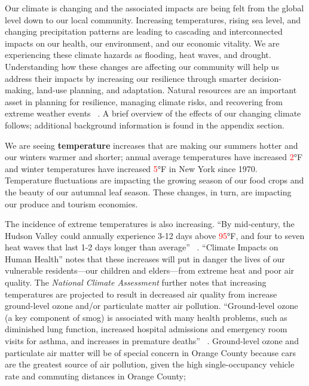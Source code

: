 Our climate is changing and the associated impacts are being felt from the 
global level down to our local community. Increasing temperatures, rising sea 
level, and changing precipitation patterns are leading to cascading and 
interconnected impacts on our health, our environment, and our economic 
vitality. We are experiencing these climate hazards as flooding, heat waves, 
and drought. Understanding how these changes are affecting our community will 
help us address their impacts by increasing our resilience through smarter 
decision-making, land-use planning, and adaptation. Natural resources are an 
important asset in planning for resilience, managing climate risks, and 
recovering from extreme weather events ~\citep{haeckel2014}. A brief overview of 
the effects of our changing climate follows; additional background information 
is found in the appendix section.
\par
We are seeing \textbf{temperature} increases that are making our summers hotter 
and our winters warmer and shorter; annual average temperatures have increased 
\textcolor{red}{2}$\si{\degree}$F and winter temperatures have increased 
\textcolor{red}{5}$\si{\degree}$F in New York since 1970. Temperature fluctuations 
are impacting the growing season of our food crops and the beauty of our 
autumnal leaf season. These changes, in turn, are impacting our produce and 
tourism economies.
\par
The incidence of extreme temperatures is also increasing. ``By mid-century, 
the Hudson Valley could annually experience 3-12 days above 
\textcolor{red}{95}$\si{\degree}$F, and four to seven heat waves that last 1-2 days 
longer than average'' ~\citep{Zemaitis2018}. ``Climate Impacts on Human Health'' 
notes that these increases will put in danger the lives of our vulnerable 
residents—our children and elders—from extreme heat and poor air quality. The 
\textit{National Climate Assessment} further notes that increasing temperatures 
are projected to result in decreased air quality from increase ground-level 
ozone and/or particulate matter air pollution. ``Ground-level ozone (a key 
component of smog) is associated with many health problems, such as diminished 
lung function, increased hospital admissions and emergency room visits for 
asthma, and increases in premature deaths'' ~\citep{melillo2014climate}. 
Ground-level ozone and particulate air matter will be of special concern in 
Orange County because cars are the greatest source of air pollution, given the 
high single-occupancy vehicle rate and commuting distances in Orange County; 
